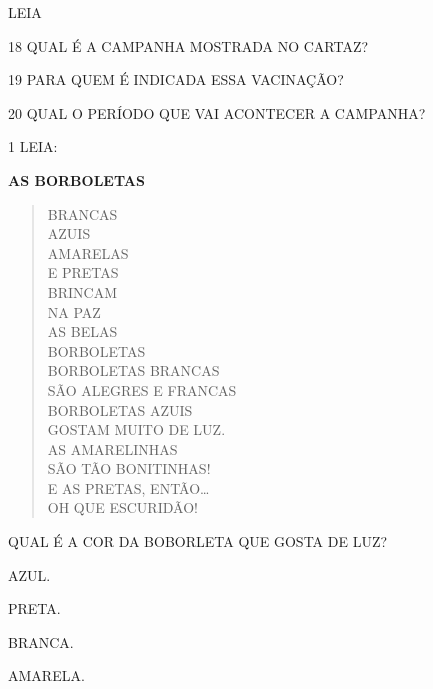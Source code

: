 \begin{escola}

LEIA


\num{18} QUAL É A CAMPANHA MOSTRADA NO CARTAZ?


\num{19} PARA QUEM É INDICADA ESSA VACINAÇÃO?


\num{20} QUAL O PERÍODO QUE VAI ACONTECER A CAMPANHA?




\num{1} LEIA:

\textbf{AS BORBOLETAS}

\begin{verse}
BRANCAS\\
AZUIS\\
AMARELAS\\
E PRETAS\\
BRINCAM\\
NA PAZ\\
AS BELAS\\
BORBOLETAS\\
BORBOLETAS BRANCAS\\
SÃO ALEGRES E FRANCAS\\
BORBOLETAS AZUIS\\
GOSTAM MUITO DE LUZ.\\
AS AMARELINHAS\\
SÃO TÃO BONITINHAS!\\
E AS PRETAS, ENTÃO\ldots{}\\
OH QUE ESCURIDÃO!
\end{verse}


QUAL É A COR DA BOBORLETA QUE GOSTA DE LUZ?

\begin{escolha}
\item
  AZUL.
\item
  PRETA.
\item
  BRANCA.
\item
  AMARELA.
\end{escolha}


\end{escola}

